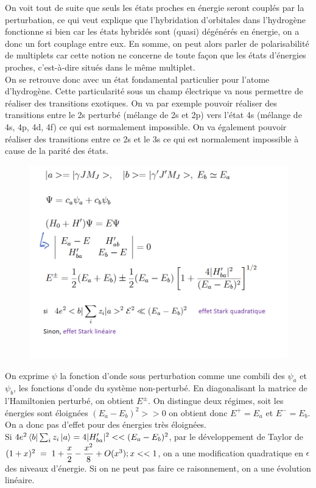 On voit tout de suite que seuls les états proches en énergie seront couplés par la perturbation, ce qui veut explique que l'hybridation d'orbitales dans l'hydrogène fonctionne si bien car les états hybridés sont (quasi) dégénérés en énergie, on a donc un fort couplage entre eux. En somme, on peut alors parler de polarisabilité de multiplets car cette notion ne concerne de toute façon que les états d'énergies proches, c'est-à-dire situés dans le même multiplet.\\

On se retrouve donc avec un état fondamental particulier pour l'atome d'hydrogène. Cette particularité sous un champ électrique va nous permettre de réaliser des transitions exotiques. On va par exemple pouvoir réaliser des transitions entre le 2s perturbé (mélange de 2s et 2p) vers l'état 4s (mélange de 4s, 4p, 4d, 4f) ce qui est normalement impossible. On va également pouvoir réaliser des transitions entre ce 2s et le 3s ce qui est normalement impossible à cause de la parité des états.\\

\begin{figure}[tph]
    \centering
    \includegraphics[scale=0.7]{Images2/EffetStark.PNG}
\end{figure}

On exprime $\psi$ la fonction d'onde sous perturbation comme une combili des $\psi_a$ et $\psi_b$, les fonctions d'onde du système non-perturbé. En diagonalisant la matrice de l'Hamiltonien perturbé, on obtient $E^{\pm}$. On distingue deux régimes, soit les énergies sont éloignées $(E_a - E_b)^2 >> 0$ on obtient donc $E^+ = E_a$ et $E^- = E_b$. On a donc pas d'effet pour des énergies très éloignées.\\
Si $4e^2\bra{b}\sum_iz_i\ket{a} = 4|H'_{ba}|^2<<(E_a - E_b)^2 $, par le développement de Taylor de $(1 + x)^2\; = \; 1 + \dfrac{x}{2} - \dfrac{x^2}{8} + O(x^3);x<<1$, on a une modification quadratique en $\epsilon$ des niveaux d'énergie. Si on ne peut pas faire ce raisonnement, on a une évolution linéaire.\\

